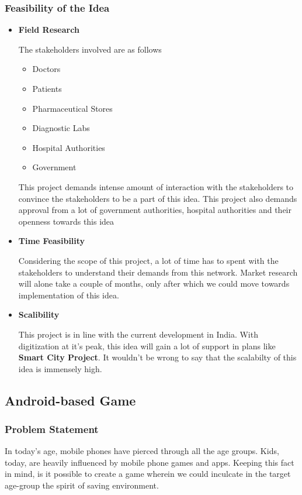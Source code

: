 \documentclass{article}
\begin{document}
\subsubsection{Feasibility of the Idea}
\begin{itemize}
\item \textbf{Field Research}
\par The stakeholders involved are as follows
\begin{itemize}
    \item Doctors
    \item Patients
    \item Pharmaceutical Stores
    \item Diagnostic Labs
    \item Hospital Authorities
    \item Government
\end{itemize}
This project demands intense amount of interaction with the stakeholders to convince the stakeholders to be a part of this idea. This project also demands approval from a lot of government authorities, hospital authorities and their openness towards this idea

\item \textbf{Time Feasibility}
\par Considering the scope of this project, a lot of time has to spent with the stakeholders to understand their demands from this network. Market research will alone take a couple of months, only after which we could move towards implementation of this idea.
\item \textbf{Scalibility}
\par This project is in line with the current development in India. With digitization at it's peak, this idea will gain a lot of support in plans like \textbf{Smart City Project}. It wouldn't be wrong to say that the scalabilty of this idea is immensely high.
\end{itemize}


\subsection{Android-based Game}
\subsubsection{Problem Statement}
\par In today's age, mobile phones have pierced through all the age groups. Kids, today, are heavily influenced by mobile phone games and apps. Keeping this fact in mind, is it possible to create a game wherein we could inculcate in the target age-group the spirit of saving environment. 
\end{document}
